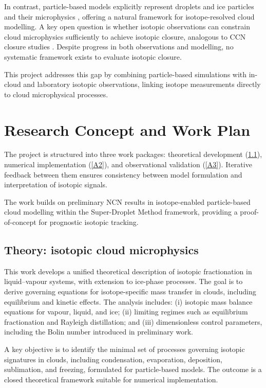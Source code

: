 \documentclass[11pt]{article}
\begin{document}
In contrast, particle-based models explicitly represent droplets and ice particles and their microphysics \parencite{2009_Shima_EtAl}, offering a natural framework for isotope-resolved cloud modelling.
A key open question is whether isotopic observations can constrain cloud microphysics sufficiently to achieve isotopic closure, analogous to CCN closure studies \parencite{2021_Knopf_EtAla}. Despite progress in both observations and modelling, no systematic framework exists to evaluate isotopic closure.

This project addresses this gap by combining particle-based simulations with in-cloud and laboratory isotopic observations, linking isotope measurements directly to cloud microphysical processes.

\section{Research Concept and Work Plan}
The project is structured into three work packages: theoretical development (\ref{A1}), numerical implementation (\ref{A2}), and observational validation (\ref{A3}). Iterative feedback between them ensures consistency between model formulation and interpretation of isotopic signals.

The work builds on preliminary NCN results in isotope-enabled particle-based cloud modelling within the Super-Droplet Method framework, providing a proof-of-concept for prognostic isotopic tracking.

\subsection{Theory: isotopic cloud microphysics}\label{A1}
This work develops a unified theoretical description of isotopic fractionation in liquid–vapour systems, with extension to ice-phase processes. The goal is to derive governing equations for isotope-specific mass transfer in clouds, including equilibrium and kinetic effects. The analysis includes: (i) isotopic mass balance equations for vapour, liquid, and ice; (ii) limiting regimes such as equilibrium fractionation and Rayleigh distillation; and (iii) dimensionless control parameters, including the Bolin number introduced in preliminary work.

A key objective is to identify the minimal set of processes governing isotopic signatures in clouds, including condensation, evaporation, deposition, sublimation, and freezing, formulated for particle-based models. The outcome is a closed theoretical framework suitable for numerical implementation.
\end{document}

